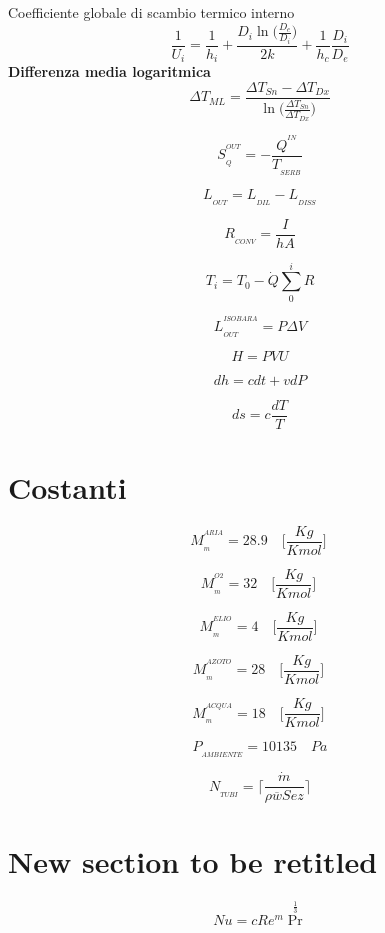 \documentclass[portrait,a4paper]{article}
\begin{document}
\begin{multicols}{3}
Coefficiente globale di scambio termico interno
\[ \frac {1}{U_{i}} = \frac {1}{h_{i}} + \frac {D_{i} \ln \Big( \frac {D_{e}}{D_{i}} \Big) } {2k} + \frac {1}{h_{c}} \frac {D_{i}}{D_{e}}  \]
\textbf{Differenza media logaritmica}
\[ \Delta T_{ML} = \frac {\Delta T_{Sn}-\Delta T_{Dx}} { \ln \Big( \frac { \Delta T_{Sn}}{\Delta T_{Dx}} \Big) }   \]









\[ S_{_Q}^{^{OUT}}= - \frac{Q^{^{IN}}}{T_{_{SERB}}} \]

\[L_{_{OUT}}= L_{_{DIL}}- L_{_{DISS}} \]




\[ R_{_{CONV}} =\frac{I}{hA}\]
	




\[ T_{i} = T_{0} - \dot Q \sum _{0}^{i} R \]	





\[L_{_{OUT}}^{^{ISOBARA}}= P \Delta V \]

\[ H = PVU \]

\[ dh = cdt + vdP \]
	
\[ds= c \frac{dT}{T}\]

\section{Costanti}


\[ M_{_{m}}^{^{ARIA}} = 28.9 \quad \Big [ \frac {Kg}{Kmol} \Big ] \ \]

\[ M_{_{m}}^{^{O2}} = 32 \quad \Big [ \frac {Kg}{Kmol} \Big ] \ \]

\[ M_{_{m}}^{^{ELIO}} = 4 \quad \Big [ \frac {Kg}{Kmol} \Big ] \ \]

\[ M_{_{m}}^{^{AZOTO}} = 28 \quad \Big [ \frac {Kg}{Kmol} \Big ] \ \]

\[ M_{_{m}}^{^{ACQUA}} = 18 \quad \Big [ \frac {Kg}{Kmol} \Big ] \ \]

\[ P_{_{AMBIENTE}} = 10135  \quad Pa \]

\[ N_{_{TUBI}} = \Bigg \lceil \frac {\dot m}{\rho \overline w Sez} \Bigg \rceil \]


\section{New section to be retitled}


\[ Nu = cRe^{m} \Pr^{\frac {1}{3}} \]















\end{multicols}
\end{document}
